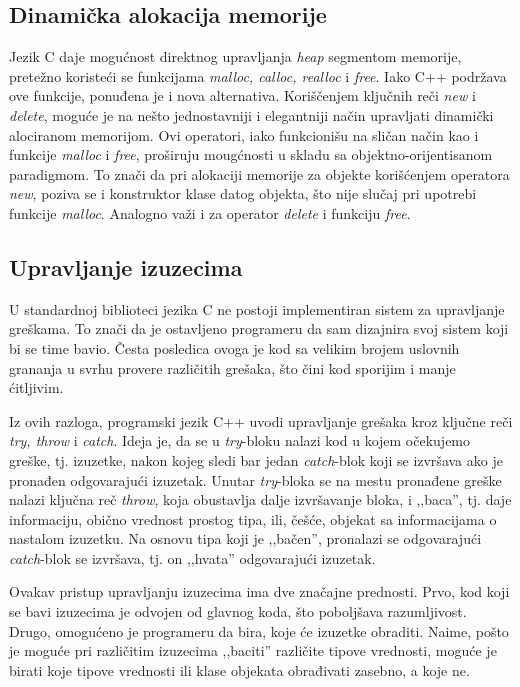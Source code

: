 \documentclass[a4paper]{article}
\begin{document}
{\subsection{Dinamička alokacija memorije}

Jezik C daje mogućnost direktnog upravljanja \emph{heap} segmentom memorije, pretežno koristeći se funkcijama \emph{malloc, calloc, realloc} i \emph{free}. Iako C++ podržava ove funkcije, ponuđena je i nova alternativa. Koriščenjem ključnih reči \emph{new} i \emph{delete}, moguće je na nešto jednostavniji i elegantniji način upravljati dinamički alociranom memorijom. Ovi operatori, iako funkcionišu na sličan način kao i funkcije \emph{malloc} i \emph{free}, proširuju mougćnosti u skladu sa objektno-orijentisanom paradigmom. To znači da pri alokaciji memorije za objekte korišćenjem operatora \emph{new}, poziva se i konstruktor klase datog objekta, što nije slučaj pri upotrebi funkcije \emph{malloc}. Analogno važi i za operator \emph{delete} i funkciju \emph{free}.


\subsection{Upravljanje izuzecima}

U standardnoj biblioteci jezika C ne postoji implementiran sistem za upravljanje greškama. To znači da je ostavljeno programeru da sam dizajnira svoj sistem koji bi se time bavio. Česta posledica ovoga je kod sa velikim brojem uslovnih grananja u svrhu provere različitih grešaka, što čini kod sporijim i manje ćitljivim.

Iz ovih razloga, programski jezik C++ uvodi upravljanje grešaka kroz ključne reči \emph{try, throw} i \emph{catch}. Ideja je, da se u \emph{try}-bloku nalazi kod u kojem očekujemo greške, tj. izuzetke, nakon kojeg sledi bar jedan \emph{catch}-blok koji se izvršava ako je pronađen odgovarajući izuzetak. Unutar \emph{try}-bloka se na mestu pronađene greške nalazi ključna reč \emph{throw}, koja obustavlja dalje izvršavanje bloka, i ,,baca'', tj. daje informaciju, obično vrednost prostog tipa, ili, češće, objekat sa informacijama o nastalom izuzetku. Na osnovu tipa koji je ,,bačen'', pronalazi se odgovarajući \emph{catch}-blok se izvršava, tj. on ,,hvata'' odgovarajući izuzetak.

Ovakav pristup upravljanju izuzecima ima dve značajne prednosti. Prvo, kod koji se bavi izuzecima je odvojen od glavnog koda, što poboljšava razumljivost. Drugo, omogućeno je programeru da bira, koje će izuzetke obraditi. Naime, pošto je moguće pri različitim izuzecima ,,baciti'' različite tipove vrednosti, moguće je birati koje tipove vrednosti ili klase objekata obrađivati zasebno, a koje ne.

}
\end{document}

